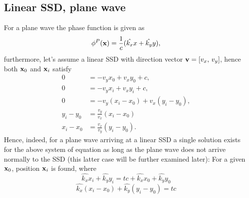 \documentclass[12pt,a4paper]{article}
\begin{document}
\subsection{Linear SSD, plane wave}
For a plane wave the phase function is given as
\begin{equation}
     \phi^P(\mathbf{x}) = \frac{1}{c} (\hat{k_x} x + \hat{k_y} y),
\end{equation}
furthermore, let's assume a linear SSD with direction vector $\mathbf{v} = [v_x, \, v_y]$, hence both $\mathbf{x}_0$ and $\mathbf{x}_i$ satisfy
\begin{align}
    0 &= -v_y x_0 + v_x y_0 + c,\\
    0 &= -v_y  x_i + v_x y_i + c,\\
    0 &= -v_y (x_i-x_0) + v_x (y_i-y_0),\\
    y_i-y_0 &= \frac{v_y}{v_x} (x_i-x_0)\\
    x_i-x_0 &= \frac{v_x}{v_y} (y_i-y_0).
\end{align}
Hence, indeed, for a plane wave arriving at a linear SSD a single solution exists for the above system of equation as long as the plane wave does not arrive normally to the SSD (this latter case will be further examined later):
For a given $\mathbf{x}_0$, position $\mathbf{x}_i$ is found, where
\begin{equation}
    \hat{k_x} x_i + \hat{k_y} y_i = t c + \hat{k_x} x_0 + \hat{k_y} y_0
\end{equation}
\begin{equation}
    \hat{k_x} (x_i-x_0) + \hat{k_y} (y_i-y_0) = t c
\end{equation}
\end{document}
